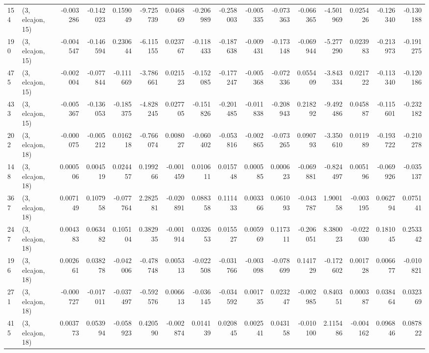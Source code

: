 \begin{tabular}{llrrrrrrrrrrrrrr}
154 &  (3, elcajon, 15) &  -0.003286 & -0.142023 &  0.159049 &    -9.725739 &   0.046869 &  -0.206989 &  -0.258003 & -0.005335 & -0.073363 & -0.066365 &   -4.501969 &  0.025426 & -0.126340 & -0.130188 \\
190 &  (3, elcajon, 15) &  -0.004547 & -0.146594 &  0.230644 &    -6.115155 &   0.023767 &  -0.118433 &  -0.187638 & -0.009431 & -0.173148 & -0.069944 &   -5.277290 &  0.023983 & -0.213973 & -0.191275 \\
475 &  (3, elcajon, 15) &  -0.002004 & -0.077844 & -0.111669 &    -3.786661 &   0.021523 &  -0.152085 &  -0.177247 & -0.005368 & -0.072336 &  0.055409 &   -3.843334 &  0.021722 & -0.113340 & -0.120186 \\
433 &  (3, elcajon, 15) &  -0.005367 & -0.136053 & -0.185375 &    -4.828245 &   0.027705 &  -0.151826 &  -0.201485 & -0.011838 & -0.208943 &  0.218292 &   -9.492486 &  0.045887 & -0.115601 & -0.232182 \\
202 &  (3, elcajon, 18) &  -0.000075 & -0.005212 &  0.016218 &    -0.766074 &   0.008027 &  -0.060402 &  -0.053816 & -0.002865 & -0.073265 &  0.090793 &   -3.350610 &  0.011989 & -0.193722 & -0.210278 \\
148 &  (3, elcajon, 18) &   0.000506 &  0.004519 &  0.024457 &     0.199266 &  -0.001459 &   0.010611 &   0.015748 &  0.000585 &  0.000623 & -0.069881 &   -0.824497 &  0.005196 & -0.069926 & -0.035137 \\
367 &  (3, elcajon, 18) &   0.007149 &  0.107958 & -0.077764 &     2.282581 &  -0.020891 &   0.088358 &   0.111433 &  0.003366 &  0.061093 & -0.043787 &    1.900158 & -0.003195 &  0.062794 &  0.075141 \\
247 &  (3, elcajon, 18) &   0.004383 &  0.063482 &  0.105104 &     0.382935 &  -0.001914 &   0.032653 &   0.015527 &  0.005969 &  0.117311 & -0.206051 &    8.380023 & -0.022030 &  0.181045 &  0.253342 \\
196 &  (3, elcajon, 18) &   0.002661 &  0.038278 & -0.042006 &    -0.478748 &   0.005313 &  -0.022508 &  -0.031766 & -0.003098 & -0.078699 &  0.141729 &   -0.172602 &  0.001728 &  0.006677 & -0.010821 \\
271 &  (3, elcajon, 18) &  -0.000727 & -0.017011 & -0.037497 &    -0.592576 &   0.006613 &  -0.036145 &  -0.034592 &  0.001735 &  0.023247 & -0.002985 &    0.840351 &  0.000387 &  0.038464 &  0.032369 \\
415 &  (3, elcajon, 18) &   0.003773 &  0.053994 & -0.058923 &     0.420590 &  -0.002874 &   0.014139 &   0.020845 &  0.002541 &  0.043158 & -0.010100 &    2.115486 & -0.004162 &  0.096846 &  0.087822 \\

\end{tabular}
